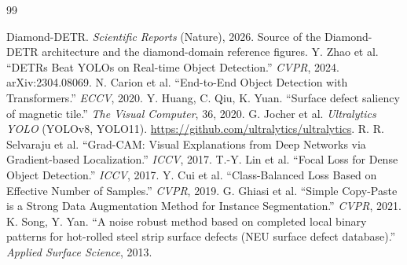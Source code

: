 \documentclass[11pt,a4paper]{article}
\begin{document}
\begin{thebibliography}{99}
\small
{} Diamond-DETR. \emph{Scientific Reports} (Nature), 2026. Source of the
Diamond-DETR architecture and the diamond-domain reference figures.
 Y. Zhao et al. ``DETRs Beat YOLOs on Real-time Object Detection.''
\emph{CVPR}, 2024. arXiv:2304.08069.
 N. Carion et al. ``End-to-End Object Detection with Transformers.''
\emph{ECCV}, 2020.
 Y. Huang, C. Qiu, K. Yuan. ``Surface defect saliency of magnetic tile.''
\emph{The Visual Computer}, 36, 2020.
 G. Jocher et al. \emph{Ultralytics YOLO} (YOLOv8, YOLO11).
\url{https://github.com/ultralytics/ultralytics}.
 R. R. Selvaraju et al. ``Grad-CAM: Visual Explanations from Deep Networks via
Gradient-based Localization.'' \emph{ICCV}, 2017.
 T.-Y. Lin et al. ``Focal Loss for Dense Object Detection.'' \emph{ICCV}, 2017.
 Y. Cui et al. ``Class-Balanced Loss Based on Effective Number of Samples.''
\emph{CVPR}, 2019.
 G. Ghiasi et al. ``Simple Copy-Paste is a Strong Data Augmentation Method for
Instance Segmentation.'' \emph{CVPR}, 2021.
 K. Song, Y. Yan. ``A noise robust method based on completed local binary patterns for
hot-rolled steel strip surface defects (NEU surface defect database).''
\emph{Applied Surface Science}, 2013.
\end{thebibliography}
\end{document}
